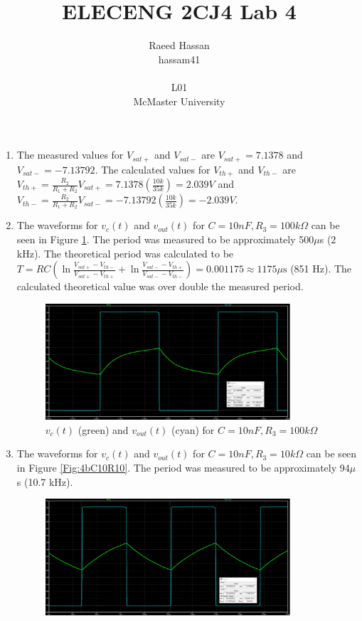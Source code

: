 \documentclass[12pt]{article}
\title{ELECENG 2CJ4 Lab 4}
\author{Raeed Hassan \\ hassam41 \\  \\ L01 \\ McMaster University}
\begin{document}
\maketitle
\pagebreak
\begin{enumerate}[label=\alph*)]
    \item The measured values for $V_{sat+}$ and $V_{sat-}$ are $V_{sat+} = 7.1378$ and $V_{sat-} = -7.13792$. The calculated values for $V_{th+}$ and $V_{th-}$ are $V_{th+} = \frac{R_2}{R_1+R_2}V_{sat+} = 7.1378\left(\frac{10k}{35k}\right) = 2.039V$ and $V_{th-} = \frac{R_2}{R_1+R_2}V_{sat-} = -7.13792\left(\frac{10k}{35k}\right) = -2.039V$.
    \item The waveforms for $v_c(t)$ and $v_{out}(t)$ for $C = 10nF, R_3 = 100k\Omega$ can be seen in Figure \ref{Fig:4bC10R100}. The period was measured to be approximately 500$\mu$s (2 kHz). The theoretical period was calculated to be $T = RC \left( \ln\frac{V_{sat+}-V_{th-}}{V_{sat+}-V_{th+}} + \ln\frac{V_{sat-}-V_{th+}}{V_{sat-}-V_{th-}} \right) = 0.001175 \approx 1175\mu\text{s}$ (851 Hz). The calculated theoretical value was over double the measured period.  
    \begin{figure}[h!]
        \centering
        \includegraphics[width=0.86\textwidth]{4bC10R100.png}
        \caption{$v_c(t)$ (green) and $v_{out}(t)$ (cyan) for $C = 10nF, R_3 = 100k\Omega$}
        \label{Fig:4bC10R100}
    \end{figure}
    \item The waveforms for $v_c(t)$ and $v_{out}(t)$ for $C = 10nF, R_3 = 10k\Omega$ can be seen in Figure \ref{Fig:4bC10R10}. The period was measured to be approximately 94$\mu$s (10.7 kHz).
    \begin{figure}[h!]
        \centering
        \includegraphics[width=0.86\textwidth]{4bC10R10.png}

\end{figure}
\end{enumerate}
\end{document}
